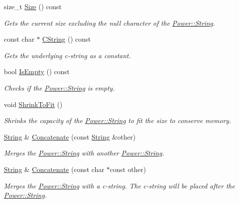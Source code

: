 \begin{DoxyCompactItemize}
size\+\_\+t \hyperlink{class_power_1_1_string_aa62245fcf9bd8261b4b13c558dc45daf}{Size} () const
\begin{DoxyCompactList}\small\item\em Gets the current size excluding the null character of the \hyperlink{class_power_1_1_string}{Power\+::\+String}. \end{DoxyCompactList}\item 
const char $\ast$ \hyperlink{class_power_1_1_string_a8a0120f3e5dee6cb50be979f8b1175e4}{C\+String} () const
\begin{DoxyCompactList}\small\item\em Gets the underlying c-\/string as a constant. \end{DoxyCompactList}\item 
bool \hyperlink{class_power_1_1_string_a5b5172ee0ef52329b5e71b10118261af}{Is\+Empty} () const
\begin{DoxyCompactList}\small\item\em Checks if the \hyperlink{class_power_1_1_string}{Power\+::\+String} is empty. \end{DoxyCompactList}\item 
void \hyperlink{class_power_1_1_string_a5a787c065417773262c90e8da4e8e079}{Shrink\+To\+Fit} ()
\begin{DoxyCompactList}\small\item\em Shrinks the capacity of the \hyperlink{class_power_1_1_string}{Power\+::\+String} to fit the size to conserve memory. \end{DoxyCompactList}\item 
\hyperlink{class_power_1_1_string}{String} \& \hyperlink{class_power_1_1_string_aca4d6272dba914cf0fa66b69e615d0ab}{Concatenate} (const \hyperlink{class_power_1_1_string}{String} \&other)
\begin{DoxyCompactList}\small\item\em Merges the \hyperlink{class_power_1_1_string}{Power\+::\+String} with another \hyperlink{class_power_1_1_string}{Power\+::\+String}. \end{DoxyCompactList}\item 
\hyperlink{class_power_1_1_string}{String} \& \hyperlink{class_power_1_1_string_a366471411eb6e5eed0cc6b4754d740fb}{Concatenate} (const char $\ast$const other)
\begin{DoxyCompactList}\small\item\em Merges the \hyperlink{class_power_1_1_string}{Power\+::\+String} with a c-\/string. The c-\/string will be placed after the \hyperlink{class_power_1_1_string}{Power\+::\+String}. \end{DoxyCompactList}\item 

\end{DoxyCompactItemize}
